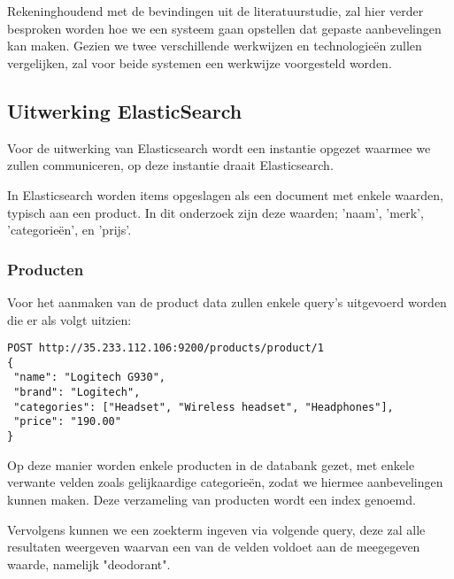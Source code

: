 

\chapter{}
\label{ch:methodologie}


Rekeninghoudend met de bevindingen uit de literatuurstudie, zal hier verder besproken worden hoe we een systeem gaan opstellen dat gepaste aanbevelingen kan maken. Gezien we twee verschillende werkwijzen en technologieën zullen vergelijken, zal voor beide systemen een werkwijze voorgesteld worden.

\section{Uitwerking ElasticSearch}
\label{sec:Uitwerking ElasticSearch}

Voor de uitwerking van Elasticsearch wordt een instantie opgezet waarmee we zullen communiceren, op deze instantie draait Elasticsearch. 

In Elasticsearch worden items opgeslagen als een document met enkele waarden, typisch aan een product. In dit onderzoek zijn deze waarden; 'naam', 'merk', 'categorieën', en 'prijs'. 

\subsection{Producten}
\label{sec:Producten}
Voor het aanmaken van de product data zullen enkele query's uitgevoerd worden die er als volgt uitzien:

\begin{lstlisting}[caption={Query om één enkel product aan te maken},captionpos=b]
POST http://35.233.112.106:9200/products/product/1 
{ 
 "name": "Logitech G930",
 "brand": "Logitech",
 "categories": ["Headset", "Wireless headset", "Headphones"],
 "price": "190.00"
}
\end{lstlisting}

Op deze manier worden enkele producten in de databank gezet, met enkele verwante velden zoals gelijkaardige categorieën, zodat we hiermee aanbevelingen kunnen maken. Deze verzameling van producten wordt een index genoemd.

Vervolgens kunnen we een zoekterm ingeven via volgende query, deze zal alle resultaten weergeven waarvan een van de velden voldoet aan de meegegeven waarde, namelijk "deodorant". 

